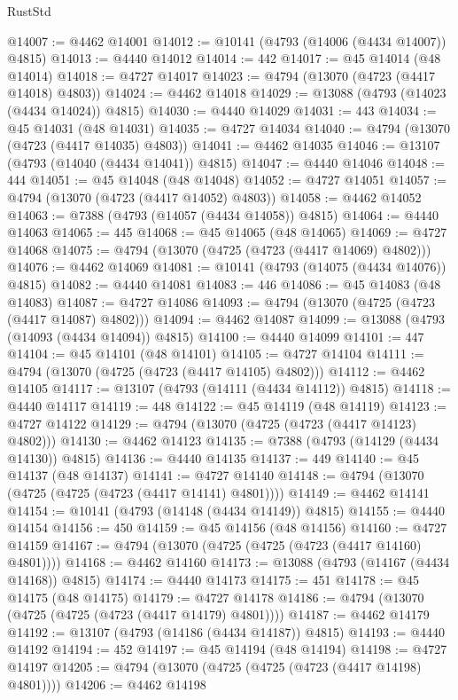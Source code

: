 \begin{lexlean}{RustStd}
\begin{coremodule}
{\begin{coremodule}
{{{{{{{{{{{{{{{{{{{{{{{{{{{{{{{{{{{{{{{{{{{{{{{{{{{{{{{{{{{{@14007 := @4462 @14001
@14012 := @10141 (@4793 (@14006 (@4434 @14007)) @4815)
@14013 := @4440 @14012
@14014 := 442
@14017 := @45 @14014 (@48 @14014)
@14018 := @4727 @14017
@14023 := @4794 (@13070 (@4723 (@4417 @14018) @4803))
@14024 := @4462 @14018
@14029 := @13088 (@4793 (@14023 (@4434 @14024)) @4815)
@14030 := @4440 @14029
@14031 := 443
@14034 := @45 @14031 (@48 @14031)
@14035 := @4727 @14034
@14040 := @4794 (@13070 (@4723 (@4417 @14035) @4803))
@14041 := @4462 @14035
@14046 := @13107 (@4793 (@14040 (@4434 @14041)) @4815)
@14047 := @4440 @14046
@14048 := 444
@14051 := @45 @14048 (@48 @14048)
@14052 := @4727 @14051
@14057 := @4794 (@13070 (@4723 (@4417 @14052) @4803))
@14058 := @4462 @14052
@14063 := @7388 (@4793 (@14057 (@4434 @14058)) @4815)
@14064 := @4440 @14063
@14065 := 445
@14068 := @45 @14065 (@48 @14065)
@14069 := @4727 @14068
@14075 := @4794 (@13070 (@4725 (@4723 (@4417 @14069) @4802)))
@14076 := @4462 @14069
@14081 := @10141 (@4793 (@14075 (@4434 @14076)) @4815)
@14082 := @4440 @14081
@14083 := 446
@14086 := @45 @14083 (@48 @14083)
@14087 := @4727 @14086
@14093 := @4794 (@13070 (@4725 (@4723 (@4417 @14087) @4802)))
@14094 := @4462 @14087
@14099 := @13088 (@4793 (@14093 (@4434 @14094)) @4815)
@14100 := @4440 @14099
@14101 := 447
@14104 := @45 @14101 (@48 @14101)
@14105 := @4727 @14104
@14111 := @4794 (@13070 (@4725 (@4723 (@4417 @14105) @4802)))
@14112 := @4462 @14105
@14117 := @13107 (@4793 (@14111 (@4434 @14112)) @4815)
@14118 := @4440 @14117
@14119 := 448
@14122 := @45 @14119 (@48 @14119)
@14123 := @4727 @14122
@14129 := @4794 (@13070 (@4725 (@4723 (@4417 @14123) @4802)))
@14130 := @4462 @14123
@14135 := @7388 (@4793 (@14129 (@4434 @14130)) @4815)
@14136 := @4440 @14135
@14137 := 449
@14140 := @45 @14137 (@48 @14137)
@14141 := @4727 @14140
@14148 := @4794 (@13070 (@4725 (@4725 (@4723 (@4417 @14141) @4801))))
@14149 := @4462 @14141
@14154 := @10141 (@4793 (@14148 (@4434 @14149)) @4815)
@14155 := @4440 @14154
@14156 := 450
@14159 := @45 @14156 (@48 @14156)
@14160 := @4727 @14159
@14167 := @4794 (@13070 (@4725 (@4725 (@4723 (@4417 @14160) @4801))))
@14168 := @4462 @14160
@14173 := @13088 (@4793 (@14167 (@4434 @14168)) @4815)
@14174 := @4440 @14173
@14175 := 451
@14178 := @45 @14175 (@48 @14175)
@14179 := @4727 @14178
@14186 := @4794 (@13070 (@4725 (@4725 (@4723 (@4417 @14179) @4801))))
@14187 := @4462 @14179
@14192 := @13107 (@4793 (@14186 (@4434 @14187)) @4815)
@14193 := @4440 @14192
@14194 := 452
@14197 := @45 @14194 (@48 @14194)
@14198 := @4727 @14197
@14205 := @4794 (@13070 (@4725 (@4725 (@4723 (@4417 @14198) @4801))))
@14206 := @4462 @14198
}}}}}}}}}}}}}}}}}}}}}}}}}}}}}}}}}}}}}}}}}}}}}}}}}}}}}}}}}}}}
\end{coremodule}}
\end{coremodule}
\end{lexlean}
